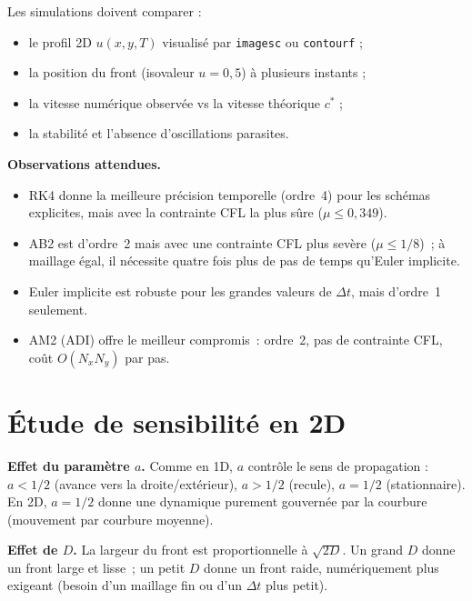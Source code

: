 \documentclass[11pt,a4paper]{report}
\begin{document}
Les simulations doivent comparer :
\begin{itemize}[leftmargin=1.5em]
  \item le profil 2D $u(x,y,T)$ visualis\'e par \texttt{imagesc} ou \texttt{contourf} ;
  \item la position du front (isovaleur $u=0{,}5$) \`a plusieurs instants ;
  \item la vitesse num\'erique observ\'ee vs la vitesse th\'eorique $c^*$ ;
  \item la stabilit\'e et l'absence d'oscillations parasites.
\end{itemize}

\textbf{Observations attendues.}
\begin{itemize}[leftmargin=1.5em]
  \item RK4 donne la meilleure pr\'ecision temporelle (ordre~4) pour les sch\'emas
        explicites, mais avec la contrainte CFL la plus s\^ure ($\mu\le 0{,}349$).
  \item AB2 est d'ordre~2 mais avec une contrainte CFL plus sev\`ere ($\mu\le 1/8$)~;
        \`a maillage \'egal, il n\'ecessite quatre fois plus de pas de temps qu'Euler
        implicite.
  \item Euler implicite est robuste pour les grandes valeurs de $\Delta t$, mais
        d'ordre~1 seulement.
  \item AM2 (ADI) offre le meilleur compromis~: ordre~2, pas de contrainte CFL,
        co\^ut $O(N_xN_y)$ par pas.
\end{itemize}

\section{\'Etude de sensibilit\'e en 2D}

\textbf{Effet du param\`etre $a$.}
Comme en 1D, $a$ contr\^ole le sens de propagation :
$a<1/2$ (avance vers la droite/ext\'erieur), $a>1/2$ (recule), $a=1/2$ (stationnaire).
En 2D, $a=1/2$ donne une dynamique purement gouvern\'ee par la courbure (mouvement par
courbure moyenne).

\textbf{Effet de $D$.}
La largeur du front est proportionnelle \`a $\sqrt{2D}$. Un grand $D$ donne
un front large et lisse~; un petit $D$ donne un front raide, num\'eriquement plus
exigeant (besoin d'un maillage fin ou d'un $\Delta t$ plus petit).
\end{document}
